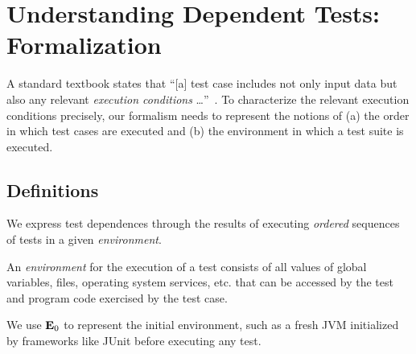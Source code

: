 
\section{Understanding Dependent Tests: Formalization}
\label{sec:formalism}

A standard textbook states that ``[a] test case includes not only input data but
also any relevant \emph{execution conditions}
\dots''~\cite[p.~152, emphasis added]{pezze-young:2007}.   
To characterize the relevant execution conditions precisely, 
our formalism needs to represent the notions of
(a) the order in which test cases are executed and (b) the environment in which a test suite is executed.  


\subsection{Definitions}
\label{sec:definitions}

We express test dependences through the results of executing
\emph{ordered} sequences of tests in a given \emph{environment}.


\begin{definition}[Environment]
An \emph{environment} \env for the execution of a test
consists of all values of global variables, files,
operating
system services, etc. that
can be accessed by the test and program code exercised by the test
case.
%
\end{definition}

We use $\mathbf{E}_0$ to represent the initial environment, such
as a fresh JVM initialized by frameworks like JUnit
before executing any test.




